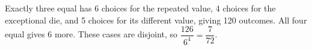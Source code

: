 Exactly three equal has 6 choices for the repeated value, 4 choices for the exceptional die, and 5 choices for its different value, giving 120 outcomes. All four equal gives 6 more. These cases are disjoint, so $\boxed{\dfrac{126}{6^4}=\dfrac{7}{72}}$.
